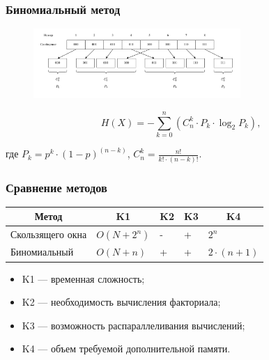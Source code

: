 \documentclass{bmstu-pr}
\begin{document}
\begin{frame}
    \frametitle{Биномиальный метод}
    
	\begin{figure}[h]
    		\centering
    		\includegraphics[width=0.7\textwidth]{img/binomial-method.pdf}
	\end{figure}
    
	\begin{equation}
		H(X) = -\sum_{k = 0}^n (C_{n}^k \cdot P_{k} \cdot \log_{2}P_{k}),
	\end{equation}
	
	где $P_{k} = p^k \cdot (1 - p)^{(n - k)}$, $C_{n}^k = \frac{n!}{k! \cdot (n - k)!}$.

\end{frame}

\begin{frame}
    \frametitle{Сравнение методов}
    
	\begin{table}[h]
    			\begin{center}
        		\begin{tabular}{|l|l|l|l|l|}
        			\hline
            		\multicolumn{1}{|c}{\textbf{Метод}} & 
            		\multicolumn{1}{|c|}{\textbf{K1}} &
            		\multicolumn{1}{c|}{\textbf{K2}} &
            		\multicolumn{1}{c|}{\textbf{K3}} & 
            		\multicolumn{1}{c|}{\textbf{K4}} \\ \hline
            		Скользящего окна &  $O(N + 2^n)$ & - & + & $2^n$ \\ \hline
            		Биномиальный &  $O(N + n)$ & + & + & $2 \cdot (n + 1)$ \\ \hline
        		\end{tabular}
    		\end{center}
	\end{table}
	
	\begin{itemize}
		\item K1 --- временная сложность;
		\item K2 --- необходимость вычисления факториала;
		\item K3 --- возможность распараллеливания вычислений;
		\item K4 --- объем требуемой дополнительной памяти.
	\end{itemize}

\end{frame}
\end{document}
